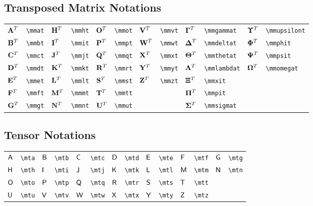 \documentclass{article}
\begin{document}
\subsection{Transposed Matrix Notations}
\begin{tabular}{*{12}{l}}
${{\mathbf A}^T}$ & \lstinline`\mmat` & ${{\mathbf H}^T}$ & \lstinline`\mmht` & ${{\mathbf O}^T}$ & \lstinline`\mmot` & ${{\mathbf V}^T}$ & \lstinline`\mmvt` & ${{\bm \Gamma}^T}$ & \lstinline`\mmgammat` & ${{\bm \Upsilon}^T}$ & \lstinline`\mmupsilont`\\
${{\mathbf B}^T}$ & \lstinline`\mmbt` & ${{\mathbf I}^T}$ & \lstinline`\mmit` & ${{\mathbf P}^T}$ & \lstinline`\mmpt` & ${{\mathbf W}^T}$ & \lstinline`\mmwt` & ${{\bm \Delta}^T}$ & \lstinline`\mmdeltat` & ${{\bm \Phi}^T}$ & \lstinline`\mmphit`\\
${{\mathbf C}^T}$ & \lstinline`\mmct` & ${{\mathbf J}^T}$ & \lstinline`\mmjt` & ${{\mathbf Q}^T}$ & \lstinline`\mmqt` & ${{\mathbf X}^T}$ & \lstinline`\mmxt` & ${{\bm \Theta}^T}$ & \lstinline`\mmthetat` & ${{\bm \Psi}^T}$ & \lstinline`\mmpsit`\\
${{\mathbf D}^T}$ & \lstinline`\mmdt` & ${{\mathbf K}^T}$ & \lstinline`\mmkt` & ${{\mathbf R}^T}$ & \lstinline`\mmrt` & ${{\mathbf Y}^T}$ & \lstinline`\mmyt` & ${{\bm \Lambda}^T}$ & \lstinline`\mmlambdat` & ${{\bm \Omega}^T}$ & \lstinline`\mmomegat`\\
${{\mathbf E}^T}$ & \lstinline`\mmet` & ${{\mathbf L}^T}$ & \lstinline`\mmlt` & ${{\mathbf S}^T}$ & \lstinline`\mmst` & ${{\mathbf Z}^T}$ & \lstinline`\mmzt` & ${{\bm \Xi}^T}$ & \lstinline`\mmxit` & \\
${{\mathbf F}^T}$ & \lstinline`\mmft` & ${{\mathbf M}^T}$ & \lstinline`\mmmt` & ${{\mathbf T}^T}$ & \lstinline`\mmtt` &  &  & ${{\bm \Pi}^T}$ & \lstinline`\mmpit` & \\
${{\mathbf G}^T}$ & \lstinline`\mmgt` & ${{\mathbf N}^T}$ & \lstinline`\mmnt` & ${{\mathbf U}^T}$ & \lstinline`\mmut` &  &  & ${{\bm \Sigma}^T}$ & \lstinline`\mmsigmat` & \\
\end{tabular}

\subsection{Tensor Notations}
\begin{tabular}{*{14}{l}}
${\mathsf A}$ & \lstinline`\mta` & ${\mathsf B}$ & \lstinline`\mtb` & ${\mathsf C}$ & \lstinline`\mtc` & ${\mathsf D}$ & \lstinline`\mtd` & ${\mathsf E}$ & \lstinline`\mte` & ${\mathsf F}$ & \lstinline`\mtf` & ${\mathsf G}$ & \lstinline`\mtg`\\
${\mathsf H}$ & \lstinline`\mth` & ${\mathsf I}$ & \lstinline`\mti` & ${\mathsf J}$ & \lstinline`\mtj` & ${\mathsf K}$ & \lstinline`\mtk` & ${\mathsf L}$ & \lstinline`\mtl` & ${\mathsf M}$ & \lstinline`\mtm` & ${\mathsf N}$ & \lstinline`\mtn`\\
${\mathsf O}$ & \lstinline`\mto` & ${\mathsf P}$ & \lstinline`\mtp` & ${\mathsf Q}$ & \lstinline`\mtq` & ${\mathsf R}$ & \lstinline`\mtr` & ${\mathsf S}$ & \lstinline`\mts` & ${\mathsf T}$ & \lstinline`\mtt`\\
${\mathsf U}$ & \lstinline`\mtu` & ${\mathsf V}$ & \lstinline`\mtv` & ${\mathsf W}$ & \lstinline`\mtw` & ${\mathsf X}$ & \lstinline`\mtx` & ${\mathsf Y}$ & \lstinline`\mty` & ${\mathsf Z}$ & \lstinline`\mtz`\\
\end{tabular}
\end{document}
